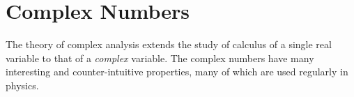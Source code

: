 \begingroup
    \ifcsname\PATH\endcsname
        \newcommand{\PATH}{books/Analysis/Complex_Analysis}
        \newcommand{\OLDPATH}{\PATH}
    \else
        \newcommand{\OLDPATH}{\PATH}
        \renewcommand{\PATH}{books/Analysis/Complex_Analysis}
    \fi
    \chapter{Complex Numbers}
        The theory of complex analysis extends the study of calculus of a
        single real variable to that of a \textit{complex} variable. The
        complex numbers have many interesting and counter-intuitive properties,
        many of which are used regularly in physics.
        
    \renewcommand{\PATH}{\OLDPATH}
\endgroup